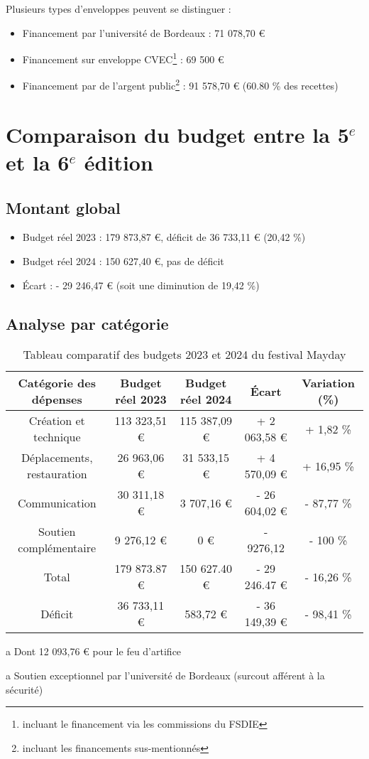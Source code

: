 \documentclass[12pt,a4paper]{report}
\begin{document}
Plusieurs types d'enveloppes peuvent se distinguer : 
\begin{itemize}
\item Financement par l'université de Bordeaux : 71 078,70 €
\item Financement sur enveloppe CVEC\footnote{incluant le financement via les commissions du FSDIE} : 69 500 €
\item Financement par de l'argent public\footnote{incluant les financements sus-mentionnés} : 91 578,70 € (60.80 \% des recettes)
\end{itemize}

\section{Comparaison du budget entre la 5$^e$ et la 6$^e$ édition}
\subsection{Montant global}
\begin{itemize}
\item Budget réel 2023 : 179 873,87 €, déficit de 36 733,11 € (20,42 \%)
\item Budget réel 2024 : 150 627,40 €, pas de déficit
\item Écart : - 29 246,47 € (soit une diminution de 19,42 \%)
\end{itemize}

\subsection{Analyse par catégorie}
\begin{table}[h!]
\centering
\begin{threeparttable}
\begin{tabular}{|c|c|c|c|c|}
\hline
Catégorie des dépenses & Budget réel 2023 & Budget réel 2024 & Écart & Variation (\%) \\
\hline
Création et technique & 113 323,51 € & 115 387,09 € & + 2 063,58 € & + 1,82 \% \\
Déplacements, restauration & 26 963,06 € & 31 533,15 € & + 4 570,09 € & + 16,95 \% \\
Communication & 30 311,18 €\tnote{a} & 3 707,16 € & - 26 604,02 € & - 87,77 \% \\
Soutien complémentaire\tnote{b} & 9 276,12 € & 0 € & - 9276,12 & - 100 \%\\
\hline
Total & 179 873.87 € & 150 627.40 € & - 29 246.47 € & - 16,26 \%\\
\hline
\hline
Déficit & 36 733,11 € & 583,72 € & - 36 149,39 € & - 98,41 \%\\
\hline
\end{tabular}
\caption{Tableau comparatif des budgets 2023 et 2024 du festival Mayday}
\begin{tablenotes}
   \item[a] Dont 12 093,76 € pour le feu d'artifice
   \item[a] Soutien exceptionnel par l'université de Bordeaux (surcout afférent à la sécurité)
\end{tablenotes}
\end{threeparttable}
\end{table}
\end{document}
